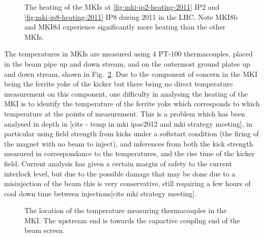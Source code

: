 \begin{figure}
\label{fig:mki-heating-2011}
\caption{The heating of the MKIs at \ref{fig:mki-ip2-heating-2011} IP2 and \ref{fig:mki-ip8-heating-2011} IP8 during 2011 in the LHC. Note MKI8b and MKI8d experience significantly more heating than the other MKIs.}
\end{figure}

The temperatures in MKIs are measured using 4 PT-100 thermacouples, placed in the beam pipe up and down stream, and on the outermost ground plates up and down stream, shown in Fig.~\ref{fig:mki-thermacouple-location}. Due to the component of concern in the MKI being the ferrite yoke of the kicker but there being no direct temperature measurement on this component, one difficulty in analysing the heating of the MKI is to identify the temperature of the ferrite yoke which corresponds to which temperature at the points of measurement. This is a problem which has been analysed in depth in [cite - temp in mki ipac2012 and mki strategy meeting], in particular using field strength from kicks under a softstart condition (the firing of the magnet with no beam to inject), and inferences from both the kick strength measured in correspondance to the temperatures, and the rise time of the kicker field. Current analysis has given a certain margin of safety to the current interlock level, but due to the possible damage that may be done due to a misinjection of the beam this is very conservative, still requiring a few hours of cool down time between injections[cite mki strategy meeting].

\begin{figure}
\label{fig:mki-thermacouple-location}
\caption{The location of the temperature measuring thermacouples in the MKI. The upstream end is towards the capactive coupling end of the beam screen.}
\end{figure}

